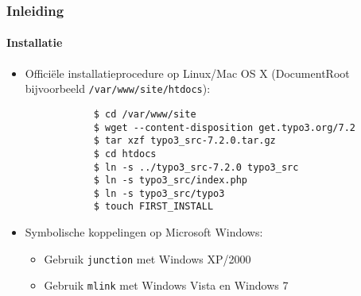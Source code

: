 \begin{frame}[fragile]
	\frametitle{Inleiding}
	\framesubtitle{Installatie}

	\begin{itemize}
		\item Officiële installatieprocedure op Linux/Mac OS X\newline
			(DocumentRoot bijvoorbeeld \texttt{/var/www/site/htdocs}):
		\begin{lstlisting}
			$ cd /var/www/site
			$ wget --content-disposition get.typo3.org/7.2
			$ tar xzf typo3_src-7.2.0.tar.gz
			$ cd htdocs
			$ ln -s ../typo3_src-7.2.0 typo3_src
			$ ln -s typo3_src/index.php
			$ ln -s typo3_src/typo3
			$ touch FIRST_INSTALL
		\end{lstlisting}

		\item Symbolische koppelingen op Microsoft Windows:

			\begin{itemize}
				\item Gebruik \texttt{junction} met Windows XP/2000
				\item Gebruik \texttt{mlink} met Windows Vista en Windows 7
			\end{itemize}

	\end{itemize}
\end{frame}

